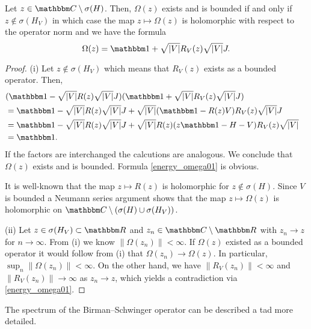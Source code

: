 \begin{lemma}\label{energy_omega}
Let $z\in\C\setminus\sigma(H)$. Then, $\Omega(z)$ exists and is bounded if and only if
$z\notin\sigma(H_V)$ in which case the map $z\mapsto\Omega(z)$ is holomorphic with respect 
to the operator norm and we have the formula
\begin{equation}\label{energy_omega01}
  \Omega(z) = \id + \sqrt{|V|} R_V(z) \sqrt{|V|}J .
\end{equation}
\end{lemma}
\begin{proof}
(i) 
Let $z\notin\sigma(H_V)$ which means that $R_V(z)$ exists as a bounded operator. Then,
\begin{equation*}
\begin{split}
\lefteqn{ (\id - \sqrt{|V|}R(z)\sqrt{|V|}J)(\id + \sqrt{|V|}R_V(z)\sqrt{|V|}J) }\\
   & = \id - \sqrt{|V|}R(z)\sqrt{|V|}J + \sqrt{|V|} ( \id - R(z)V ) R_V(z)\sqrt{|V|}J\\
   & = \id - \sqrt{|V|}R(z)\sqrt{|V|}J + \sqrt{|V|}R(z) (z\id - H - V ) R_V(z)\sqrt{|V|}\\
   & = \id .
\end{split}
\end{equation*}
If the factors are interchanged the calcutions are analogous. We conclude that $\Omega(z)$ exists and is bounded.
Formula \eqref{energy_omega01} is obvious.
 
It is well-known that the map $z\mapsto R(z)$ is holomorphic for $z\notin\sigma(H)$.
Since $V$ is bounded a Neumann series argument shows that the map $z\mapsto\Omega(z)$ is holomorphic 
on $\C\setminus( \sigma(H)\cup\sigma(H_V) )$.

(ii)
Let $z\in\sigma(H_V)\subset\R$ and $z_n\in\C\setminus\R$ with $z_n\to z$ for $n\to\infty$.
From (i) we know $\|\Omega(z_n)\|<\infty$.
If $\Omega(z)$ existed as a bounded operator it would follow from (i) that $\Omega(z_n)\to \Omega(z)$. In particular,
$\sup_n \|\Omega(z_n)\| < \infty$.
On the other hand, we have $\|R_V(z_n)\|<\infty$ and $\|R_V(z_n)\|\to\infty$ as $z_n\to z$, which yields a contradiction
via \eqref{energy_omega01}.
\end{proof}

The spectrum of the Birman--Schwinger operator can be described a tad more detailed.

